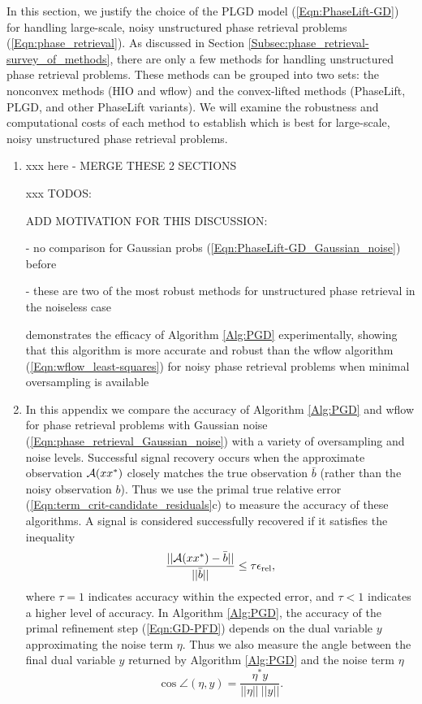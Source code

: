 In this section, we justify the choice of the PLGD model (\ref{Eqn:PhaseLift-GD}) for handling large-scale, noisy unstructured phase retrieval problems (\ref{Eqn:phase_retrieval}).  As discussed in Section \ref{Subsec:phase_retrieval-survey_of_methods}, there are only a few methods for handling unstructured phase retrieval problems.  These methods can be grouped into two sets: the nonconvex methods (HIO and wflow) and the convex-lifted methods (PhaseLift, PLGD, and other PhaseLift variants).  We will examine the robustness and computational costs of each method to establish which is best for large-scale, noisy unstructured phase retrieval problems.
 



\begin{enumerate}


\item


xxx here - MERGE THESE 2 SECTIONS

xxx TODOS:

ADD MOTIVATION FOR THIS DISCUSSION: 

- no comparison for Gaussian probs (\ref{Eqn:PhaseLift-GD_Gaussian_noise}) before

- these are two of the most robust methods for unstructured phase retrieval in the noiseless case

demonstrates the efficacy of Algorithm \ref{Alg:PGD} experimentally, showing that this algorithm is more accurate and robust than the wflow algorithm (\ref{Eqn:wflow_least-squares}) for noisy phase retrieval problems when minimal oversampling is available



\item

In this appendix we compare the accuracy of Algorithm \ref{Alg:PGD} and wflow for phase retrieval problems with Gaussian noise (\ref{Eqn:phase_retrieval_Gaussian_noise}) with a variety of oversampling and noise levels.  Successful signal recovery occurs when the approximate observation ${\mathcal A}(xx^*)$ closely matches the true observation $\bar{b}$ (rather than the noisy observation $b$).  Thus we use the primal true relative error (\ref{Eqn:term_crit-candidate_residuals}c) to measure the accuracy of these algorithms.  A signal is considered successfully recovered if it satisfies the inequality
\begin{equation} 	\label{Eqn:signal_recovery_inequality}
\frac{||{\mathcal A}(xx^*)-\bar{b}||}{ ||\bar{b}|| } \leq \tau \epsilon_{\textnormal{rel}},
\end{equation}
where $\tau = 1$ indicates accuracy within the expected error, and $\tau < 1$ indicates a higher level of accuracy.  In Algorithm \ref{Alg:PGD}, the accuracy of the primal refinement step (\ref{Eqn:GD-PFD}) depends on the dual variable $y$ approximating the noise term $\eta$.  Thus we also measure the angle between the final dual variable $y$ returned by Algorithm \ref{Alg:PGD} and the noise term $\eta$
\begin{equation} 			\label{Eqn:angle_eta_y}
	\cos \angle (\eta, y)	=	\frac{\eta^*y}{||\eta|| \ ||y||}.
\end{equation}



\end{enumerate}

